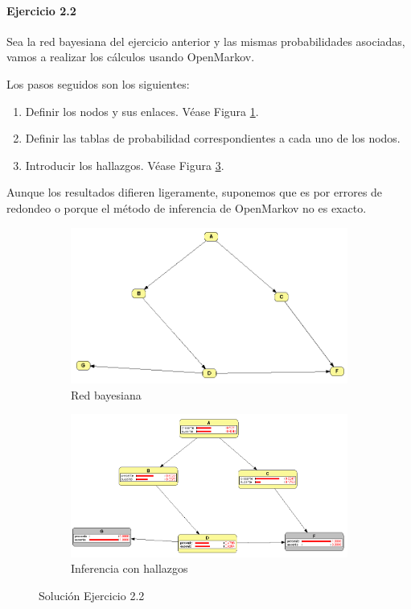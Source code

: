 \documentclass[12pt,a4paper]{article}
\begin{document}
\paragraph*{Ejercicio 2.2}
Sea la red bayesiana del ejercicio anterior y las mismas probabilidades asociadas, vamos a realizar los cálculos usando OpenMarkov.

Los pasos seguidos son los siguientes:
\begin{enumerate}
    \item Definir los nodos y sus enlaces. Véase Figura \ref{fig:bn}.
    \item Definir las tablas de probabilidad correspondientes a cada uno de los nodos.
    \item Introducir los hallazgos. Véase Figura \ref{fig:inf}.
\end{enumerate}
Aunque los resultados difieren ligeramente, suponemos que es por errores de redondeo o porque el método de inferencia de OpenMarkov no es exacto.
\newpage
\begin{figure}[h!]
    \centering
    \begin{subfigure}{\textwidth}
        \includegraphics[width=\textwidth]{bn.png}
        \caption{Red bayesiana}
        \label{fig:bn}
    \end{subfigure}
    \hfill
    \begin{subfigure}{\textwidth}
        \includegraphics[width=\textwidth]{inf.png}
        \caption{Inferencia con hallazgos}
        \label{fig:inf}
    \end{subfigure}
    \caption{Solución Ejercicio 2.2}
\end{figure}
\end{document}
